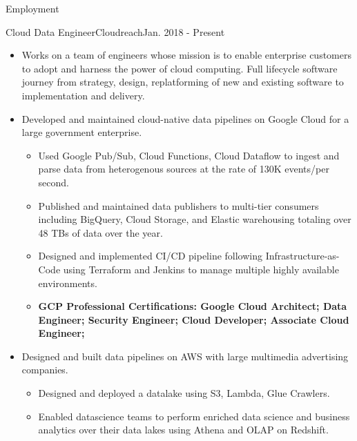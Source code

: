 \documentclass[]{mcdowellcv}
\begin{document}
    \makeheader

    \begin{cvsection}{Employment}


        \begin{cvsubsection}{Cloud Data Engineer}{Cloudreach}{Jan. 2018 - Present}
            \begin{itemize}
                \item Works on a team of engineers whose mission is to enable enterprise customers to adopt and harness the power of cloud computing. Full lifecycle software journey from strategy, design, replatforming of new and existing software to implementation and delivery. 
                \item Developed and maintained cloud-native data pipelines on Google Cloud for a large government enterprise.
                    \begin{itemize}
                            \item Used Google Pub/Sub, Cloud Functions, Cloud Dataflow to ingest and parse data from heterogenous sources at the rate of 130K events/per second. 
                            \item Published and maintained data publishers to multi-tier consumers including BigQuery, Cloud Storage, and Elastic warehousing totaling over 48 TBs of data over the year. 
                            \item Designed and implemented CI/CD pipeline following Infrastructure-as-Code using Terraform and Jenkins to manage multiple highly available environments. 
                            \item \bf{GCP Professional Certifications}: Google Cloud Architect; Data Engineer; \newline Security Engineer; Cloud Developer; Associate Cloud Engineer;
                    \end{itemize}
                \end{itemize}
                \begin{itemize}
                    \item Designed and built data pipelines on AWS with large multimedia advertising companies.
                    \begin{itemize}
                        \item Designed and deployed a datalake using S3, Lambda, Glue Crawlers. 
                        \item Enabled datascience teams to perform enriched data science and business analytics over their data lakes using Athena and OLAP on Redshift.

\end{itemize}
\end{itemize}
\end{cvsubsection}
\end{cvsection}
\end{document}
